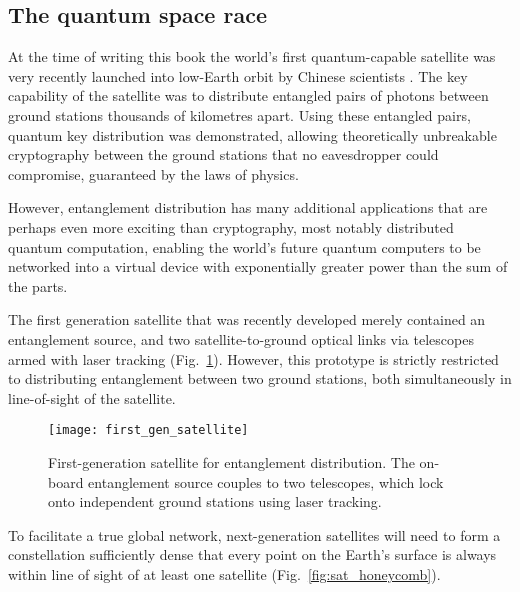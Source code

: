 %
%

\subsection{The quantum space race}\label{sec:quant_space_race_essay}

At the time of writing this book the world's first quantum-capable satellite was very recently launched into low-Earth orbit by Chinese scientists \cite{JWP}. The key capability of the satellite was to distribute entangled pairs of photons between ground stations thousands of kilometres apart. Using these entangled pairs, quantum key distribution was demonstrated, allowing theoretically unbreakable cryptography between the ground stations that no eavesdropper could compromise, guaranteed by the laws of physics.

However, entanglement distribution has many additional applications that are perhaps even more exciting than cryptography, most notably distributed quantum computation, enabling the world's future quantum computers to be networked into a virtual device with exponentially greater power than the sum of the parts.

The first generation satellite that was recently developed merely contained an entanglement source, and two satellite-to-ground optical links via telescopes armed with laser tracking (Fig.~\ref{fig:first_gen_sat}). However, this prototype is strictly restricted to distributing entanglement between two ground stations, both simultaneously in line-of-sight of the satellite.

\begin{figure}[!htb]
\texttt{[image: first\_gen\_satellite]}
\caption{First-generation satellite for entanglement distribution. The on-board entanglement source couples to two telescopes, which lock onto independent ground stations using laser tracking.}\label{fig:first_gen_sat}	
\end{figure}

To facilitate a true global network, next-generation satellites will need to form a constellation sufficiently dense that every point on the Earth's surface is always within line of sight of at least one satellite (Fig.~\ref{fig:sat_honeycomb}).

